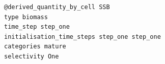 {\small{\begin{verbatim}
@derived_quantity_by_cell SSB
type biomass
time_step step_one
initialisation_time_steps step_one step_one
categories mature
selectivity One
\end{verbatim}}}
%
%
%
%

